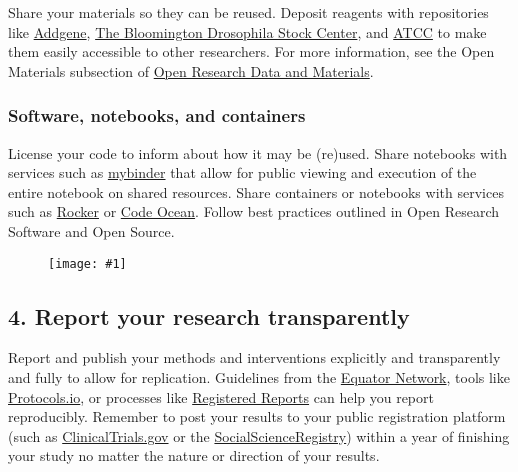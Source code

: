 \documentclass{article}
\newlength{\imgwidth}
\newcommand\scaledgraphics[2]{%
                
\settowidth{\imgwidth}{\texttt{[image: \#1]}}%
                
\setlength{\imgwidth}{\minof{\imgwidth}{#2\textwidth}}%
                
\texttt{[image: \#1]}%
                
}
\begin{document}
Share your materials so they can be reused. Deposit reagents with repositories like \href{https://www.addgene.org/}{Addgene}, \href{https://bdsc.indiana.edu/}{The Bloomington Drosophila Stock Center}, and \href{https://www.atcc.org/}{ATCC} to make them easily accessible to other researchers. For more information, see the Open Materials subsection of \href{https://github.com/Open-Science-Training-Handbook/Open-Science-Training-Handbook_EN/blob/master/02OpenScienceBasics/02OpenResearchDataAndMaterials.md}{Open Research Data and Materials}.


\subsubsection{Software, notebooks, and containers}\label{software-notebooks-and-containers}



License your code to inform about how it may be (re)used. Share notebooks with services such as \href{http://mybinder.org/}{mybinder} that allow for public viewing and execution of the entire notebook on shared resources. Share containers or notebooks with services such as \href{https://arxiv.org/abs/1710.03675}{Rocker} or \href{https://codeocean.com/}{Code Ocean}. Follow best practices outlined in Open Research Software and Open Source.

\begin{figure}
\scaledgraphics{9dfcfdf3-33f1-475f-81b9-0b157046b269.png}{1}
\label{F98076721}
\end{figure}


\subsection{\textbf{4. Report your research transparently}}\label{4-report-your-research-transparently}



Report and publish your methods and interventions explicitly and transparently and fully to allow for replication. Guidelines from the \href{http://www.equator-network.org/}{Equator Network}, tools like \href{https://www.protocols.io/}{Protocols.io}, or processes like \href{https://cos.io/rr/}{Registered Reports} can help you report reproducibly. Remember to post your results to your public registration platform (such as \href{https://www.socialscienceregistry.org/}{ClinicalTrials.gov} or the \href{https://www.socialscienceregistry.org/}{SocialScienceRegistry}) within a year of finishing your study no matter the nature or direction of your results.
\end{document}
